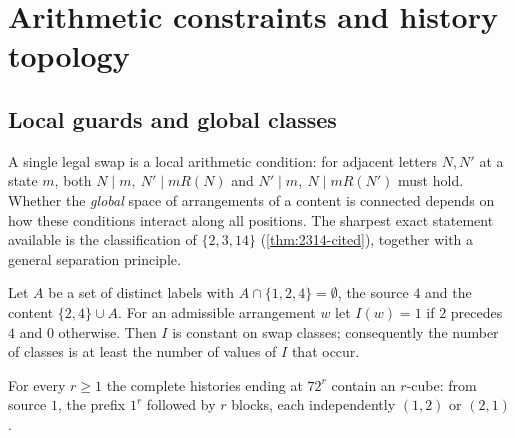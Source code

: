 \section{Arithmetic constraints and history topology}\label{sec:history}
\subsection{Local guards and global classes}
A single legal swap is a local arithmetic condition: for adjacent letters $N,N'$ at a state $m$, both $N\mid m,\ N'\mid mR(N)$ and $N'\mid m,\ N\mid mR(N')$ must hold. Whether the \emph{global} space of arrangements of a content is connected depends on how these conditions interact along all positions. The sharpest exact statement available is the classification of $\{2,3,14\}$ (\cref{thm:2314-cited}), together with a general separation principle.
\begin{theorem}\label{thm:R3T3-cited}
Let $A$ be a set of distinct labels with $A\cap\{1,2,4\}=\emptyset$, the source $4$ and the content $\{2,4\}\cup A$. For an admissible arrangement $w$ let $I(w)=1$ if $2$ precedes $4$ and $0$ otherwise. Then $I$ is constant on swap classes; consequently the number of classes is at least the number of values of $I$ that occur.
\end{theorem}
\begin{theorem}\label{thm:cube-cited}
For every $r\ge1$ the complete histories ending at $72^r$ contain an $r$-cube: from source $1$, the prefix $1^r$ followed by $r$ blocks, each independently $(1,2)$ or $(2,1)$.
\end{theorem}
